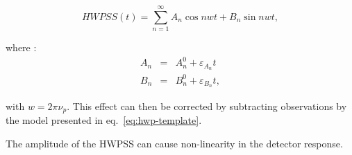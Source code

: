 \begin{equation}
HWPSS(t) = \sum_{n=1}^{\infty} A_{n} \cos nwt + B_{n} \sin nwt , 
\label{eq:hwp-template}
\end{equation}

where : 
\begin{eqnarray}
A_{n}  &=& A_{n}^{0} + \varepsilon_{A_{n}}t\\
B_{n}  &=& B_{n}^{0} + \varepsilon_{B_{n}}t, 
\end{eqnarray}

with $w = 2 \pi \nu_{p}$.
This effect can then be corrected by subtracting observations by the model presented in eq.~\ref{eq:hwp-template}. 

The amplitude of the HWPSS can cause non-linearity in the detector response. 

%
%
%
%
%
%
%
%
%

